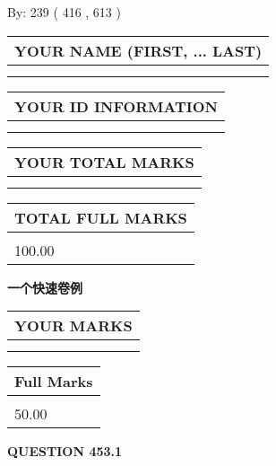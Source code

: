 \documentclass{ctexart}
\begin{document}
   
\hspace{1.0in} By: 
 239 ( 416 ,  613 )
   
   
   
   
\newpage 
\setcounter{page}{ 
   453001 } 
   
   
   
   
\noindent\begin{tabular}{|l|}
\hline
YOUR NAME (FIRST, ... LAST)  \\
\hline
 \\ 
 \\ 
\hline
\end{tabular}
\hspace{0.05in} \begin{tabular}{|l|}
\hline
 YOUR   ID   INFORMATION  \\
\hline
 \\ 
 \\ 
\hline
\end{tabular}
   
   
\vspace{0.2in}\noindent\begin{tabular}{|l|}
\hline
YOUR TOTAL MARKS  \\
\hline
 \\ 
 \\ 
\hline
\end{tabular}
\hspace{0.05in} \begin{tabular}{|l|}
\hline
TOTAL FULL MARKS  \\
\hline
 \\ 
100.00 \\
\hline
\end{tabular}
   
   
 \vspace{0.2in}
{\LARGE {\textbf{ 一个快速卷例}}}
   
   
  
\vspace{0.2in}
  
\noindent\begin{tabular}{|l|}
\hline
 YOUR MARKS  \\
\hline
 \\ 
 \\ 
\hline
\end{tabular}
\hspace{0.05in} \begin{tabular}{|l|}
\hline
 Full Marks  \\
\hline
 \\ 
50.00 \\
\hline
\end{tabular}
{\textbf{\Large{QUESTION
453.1 
}}}
  
\end{document}
